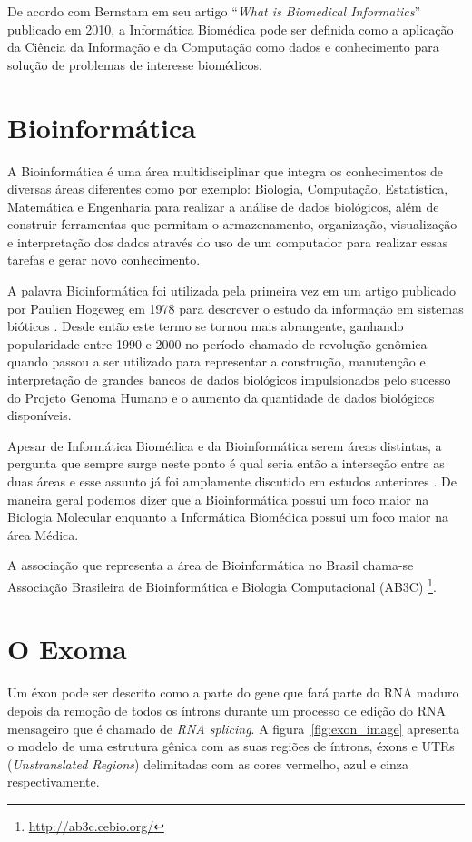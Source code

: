 De acordo com Bernstam \cite{Bernstam2010} em seu artigo ``\textit{What is Biomedical Informatics}'' publicado em 2010, a Informática Biomédica pode ser definida como a aplicação da Ciência da Informação e da Computação como dados e conhecimento para solução de problemas de interesse biomédicos.

\section{Bioinformática}

A Bioinformática é uma área multidisciplinar que integra os conhecimentos de diversas áreas diferentes como por exemplo: Biologia, Computação, Estatística, Matemática e Engenharia para realizar a análise de dados biológicos, além de construir ferramentas que permitam o armazenamento, organização, visualização e interpretação dos dados através do uso de um computador para realizar essas tarefas e gerar novo conhecimento.

A palavra Bioinformática foi utilizada pela primeira vez em um artigo publicado por Paulien Hogeweg em 1978 para descrever o estudo da informação em sistemas bióticos \cite{Hogeweg2011}. Desde então este termo se tornou mais abrangente, ganhando popularidade entre 1990 e 2000 no período chamado de revolução genômica quando passou a ser utilizado para representar a construção, manutenção e interpretação de grandes bancos de dados biológicos impulsionados pelo sucesso do Projeto Genoma Humano e o aumento da quantidade de dados biológicos disponíveis.

Apesar de Informática Biomédica e da Bioinformática serem áreas distintas, a pergunta que sempre surge neste ponto é qual seria então a interseção entre as duas áreas e esse assunto já foi amplamente discutido em estudos anteriores \cite{Practice2003, Martin-Sanchez2004}. De maneira geral podemos dizer que a Bioinformática possui um foco maior na Biologia Molecular enquanto a Informática Biomédica possui um foco maior na área Médica.

A associação que representa a área de Bioinformática no Brasil chama-se Associação Brasileira de Bioinformática e Biologia Computacional (AB3C) \footnote{\url{http://ab3c.cebio.org/}}.

\section{O Exoma}

Um éxon pode ser descrito como a parte do gene que fará parte do RNA maduro depois da remoção de todos os íntrons durante um processo de edição do RNA mensageiro que é chamado de \textit{RNA splicing}. A figura~\ref{fig:exon_image} apresenta o modelo de uma estrutura gênica com as suas regiões de íntrons, éxons e UTRs (\textit{Unstranslated Regions}) delimitadas com as cores vermelho, azul e cinza respectivamente.


